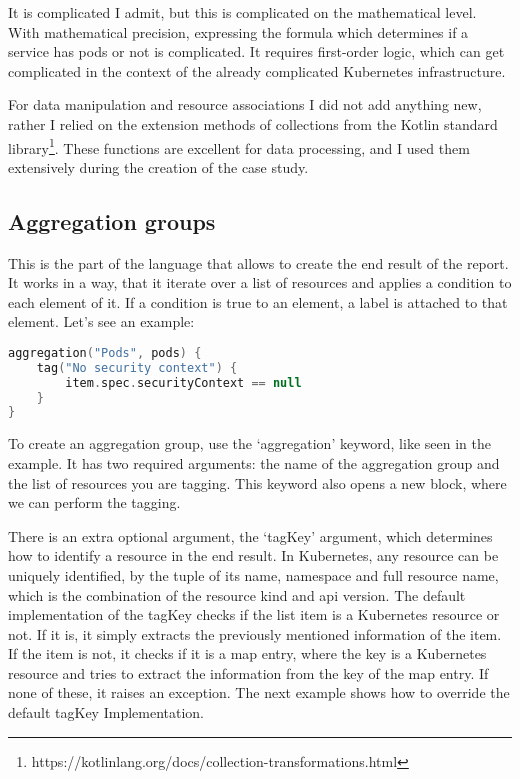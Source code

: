 It is complicated I admit, but this is complicated on the mathematical level. With mathematical precision, expressing the formula which determines if a service has pods or not is complicated. It requires first-order logic, which can get complicated in the context of the already complicated Kubernetes infrastructure.

For data manipulation and resource associations I did not add anything new, rather I relied on the extension methods of collections from the Kotlin standard library\footnote{https://kotlinlang.org/docs/collection-transformations.html}. These functions are excellent for data processing, and I used them extensively during the creation of the case study.

\subsection{Aggregation groups}

This is the part of the language that allows to create the end result of the report. It works in a way, that it iterate over a list of resources and applies a condition to each element of it. If a condition is true to an element, a label is attached to that element. Let's see an example:

\begin{lstlisting}[caption={Aggregation group example},language=Kotlin,label=code:aggregation_group]
aggregation("Pods", pods) {
    tag("No security context") {
        item.spec.securityContext == null
    }
}
\end{lstlisting}

To create an aggregation group, use the `aggregation' keyword, like seen in the example. It has two required arguments: the name of the aggregation group and the list of resources you are tagging. This keyword also opens a new block, where we can perform the tagging.

There is an extra optional argument, the `tagKey' argument, which determines how to identify a resource in the end result. In Kubernetes, any resource can be uniquely identified, by the tuple of its name, namespace and full resource name, which is the combination of the resource kind and api version. The default implementation of the tagKey checks if the list item is a Kubernetes resource or not. If it is, it simply extracts the previously mentioned information of the item. If the item is not, it checks if it is a map entry, where the key is a Kubernetes resource and tries to extract the information from the key of the map entry. If none of these, it raises an exception. The next example shows how to override the default tagKey Implementation.

